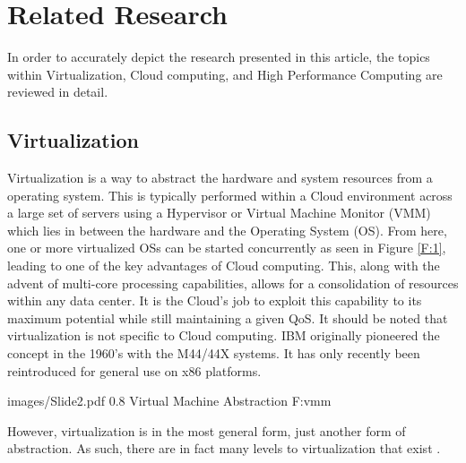 
\chapter{Related Research}
\label{chap:related}

In order to accurately depict the research presented in this article, the topics within Virtualization,  Cloud computing, and High Performance Computing are reviewed in detail. 

\section{Virtualization}
\label{sec:virtualization}


Virtualization is a way to abstract the hardware and system resources from a operating system.  This is typically performed  within a Cloud environment across a large set of servers using a Hypervisor or Virtual Machine Monitor (VMM) which lies in between the hardware and the Operating System (OS). From here, one or more virtualized OSs can be started concurrently as seen in Figure \ref{F:1}, leading to one of the key advantages of Cloud computing.  This, along with the advent of multi-core processing capabilities, allows for a consolidation of resources within any data center.  It is the Cloud's job to exploit this capability to its maximum potential while still maintaining a given QoS. It should be noted that virtualization is not specific to Cloud computing. IBM originally pioneered the concept in the 1960's with the M44/44X systems.  It has only recently been reintroduced for general use on x86 platforms. 


  {images/Slide2.pdf}
  {0.8}
  {Virtual Machine Abstraction}
  {F:vmm}
 

However, virtualization is in the most general form, just another form of abstraction. As such, there are in fact many levels to virtualization that exist \cite{hwang2013distributed}. 


